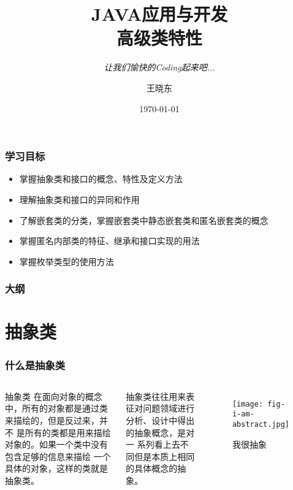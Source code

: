 
\title{\hei JAVA应用与开发\\  高级类特性}
\subtitle{\it 让我们愉快的Coding起来吧...}
\author{王晓东}
\date{\today}


\begin{frame}
  \maketitle
\end{frame}

\begin{frame}
  \frametitle{学习目标}
  \begin{itemize}
  \item 掌握抽象类和接口的概念、特性及定义方法
  \item 理解抽象类和接口的异同和作用
  \item 了解嵌套类的分类，掌握嵌套类中静态嵌套类和匿名嵌套类的概念
  \item 掌握匿名内部类的特征、继承和接口实现的用法
  \item 掌握枚举类型的使用方法
  \end{itemize}
\end{frame}

\begin{frame}
  \frametitle{大纲}
  \tableofcontents
\end{frame}

\section{抽象类}

\begin{frame}[fragile]
  \frametitle{什么是抽象类}

  \begin{columns}
    \begin{alertblock}{抽象类}
      在面向对象的概念中，所有的对象都是通过类来描绘的，但是反过来，并不
      是所有的类都是用来描绘对象的。如果一个类中没有包含足够的信息来描绘
      一个具体的对象，这样的类就是抽象类。
    \end{alertblock}
    \pause
    \begin{block}{}
      抽象类往往用来表征对问题领域进行分析、设计中得出的抽象概念，是对一
      系列看上去不同但是本质上相同的具体概念的抽象。
    \end{block}

    \begin{figure}
      \centering
      \texttt{[image: fig-i-am-abstract.jpg]}
      \caption{我很抽象}
      \label{fig:i-am-abstract}
    \end{figure}
  \end{columns}
\end{frame}

